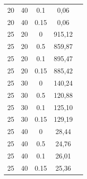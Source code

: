 \documentclass{article}
\begin{document}
\begin{longtable}{c|c|c|c|c}
20     & 40   & 0.1   & 0,06   \\
20     & 40   & 0.15  & 0,06   \\
25     & 20   & 0     & 915,12 \\
25     & 20   & 0.5   & 859,87 \\
25     & 20   & 0.1   & 895,47 \\
25     & 20   & 0.15  & 885,42 \\
25     & 30   & 0     & 140,24 \\
25     & 30   & 0.5   & 120,88 \\
25     & 30   & 0.1   & 125,10 \\
25     & 30   & 0.15  & 129,19 \\
25     & 40   & 0     & 28,44  \\
25     & 40   & 0.5   & 24,76  \\
25     & 40   & 0.1   & 26,01  \\
25     & 40   & 0.15  & 25,36 
\end{longtable}
\end{document}
